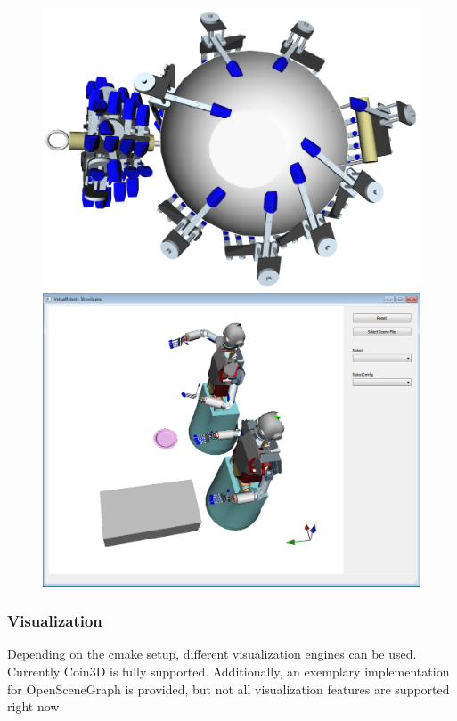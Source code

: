 \begin{figure}[H]
	\centering
	\begin{minipage} {.45\linewidth}
	  \includegraphics[width=\linewidth]{Wok_grasps_EEF}
	\end{minipage}
	\begin{minipage} {.45\linewidth}
	  \includegraphics[width=\linewidth]{Tutorial10}
	\end{minipage}	
\end{figure}
\subsubsection{Visualization}
Depending on the cmake setup, different visualization engines can be used. Currently Coin3D is fully supported. Additionally, an exemplary implementation for OpenSceneGraph is provided, but not all visualization features are supported right now.
